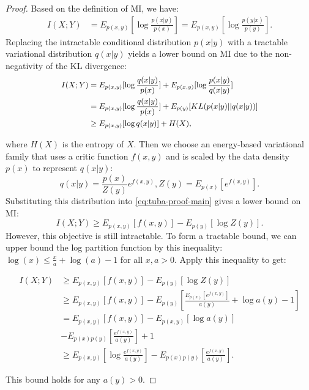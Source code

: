 \documentclass[11pt]{article}
\begin{document}
\begin{proof}
Based on the definition of MI, we have:
\begin{equation*}
    \begin{aligned}
        I(X;Y)&=E_{p(x,y)}[\log\frac{p(x|y)}{p(x)}] =E_{p(x,y)}[\log \frac{p(y|x)}{p(y)}].
    \end{aligned}
\end{equation*}
  Replacing the intractable conditional distribution $p(x|y)$ with a tractable variational distribution $q(x|y)$ yields a lower bound on MI due to the non-negativity of the KL divergence:
\begin{equation*}
    \begin{small}
\begin{align}
\label{eq:tuba-proof-main}
        I(X;Y)&=E_{p(x,y)}[\log \frac{q(x|y)}{p(x)}]+E_{p(x,y)}[\log \frac{p(x|y)}{q(x|y)}] \notag\\
        &=E_{p(x,y)}[\log \frac{q(x|y)}{p(x)}]+E_{p(y)}[KL({p(x|y)}||{q(x|y)})]\\ 
        &\geq E_{p(x,y)}[\log q(x|y)]+H(X) \notag,
\end{align}
\end{small}
\end{equation*}

where $H(X)$ is the entropy of $X$. Then we choose an energy-based variational family that uses a critic function $f(x,y)$ and is scaled by the data density $p(x)$ to represent $q(x|y)$:
\begin{equation*}
    q(x|y)=\frac{p(x)}{Z(y)}e^{f(x,y)} , Z(y)=E_{p(x)}[e^{f(x,y)}].
\end{equation*}
Substituting this distribution into \eqref{eq:tuba-proof-main} gives a lower bound on MI:
\begin{equation*}
    I(X;Y)\geq E_{p(x,y)}[f(x,y)]-E_{p(y)}[\log Z(y)].
\end{equation*}
However, this objective is still intractable. To form a tractable bound, we can upper bound the log partition function by this inequality: $\log(x)\leq \frac{x}{a}+\log(a)-1$ for all $x,a>0$. Apply this inequality to get:
\begin{small}
\begin{equation*}
    \begin{split}
        I(X;Y)&\geq E_{p(x,y)}[f(x,y)]-E_{p(y)}[\log Z(y)]\\ &\geq E_{p(x,y)}[f(x,y)]-E_{p(y)}[\frac{E_{p(x)}[e^{f(x,y)}]}{a(y)}+\log a(y)-1]\\
        &= E_{p(x,y)}[f(x,y)] - E_{p(x,y)}[\log a(y)] \\
        &- E_{p(x)p(y)}[\frac{e^{f(x,y)}}{a(y)}]+1\\
        &\geq E_{p(x,y)}[\log \frac{e^{f(x,y)}}{a(y)}] - E_{p(x)p(y)}[\frac{e^{f(x,y)}}{a(y)}].
    \end{split}
\end{equation*}
\end{small}
This bound holds for any $a(y)>0$.
\end{proof}
\end{document}
